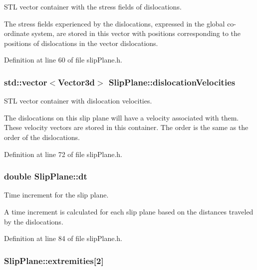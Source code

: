 S\-T\-L vector container with the stress fields of dislocations. 

The stress fields experienced by the dislocations, expressed in the global co-\/ordinate system, are stored in this vector with positions corresponding to the positions of dislocations in the vector dislocations. 

Definition at line 60 of file slip\-Plane.\-h.

\hypertarget{classSlipPlane_a107a3883169bf918664cb4e4fd4bd72c}{
\subsubsection[{dislocation\-Velocities}]{\setlength{\rightskip}{0pt plus 5cm}std\-::vector$<${\bf Vector3d}$>$ Slip\-Plane\-::dislocation\-Velocities\hspace{0.3cm}{\ttfamily [protected]}}}\label{db/d25/classSlipPlane_a107a3883169bf918664cb4e4fd4bd72c}


S\-T\-L vector container with dislocation velocities. 

The dislocations on this slip plane will have a velocity associated with them. These velocity vectors are stored in this container. The order is the same as the order of the dislocations. 

Definition at line 72 of file slip\-Plane.\-h.

\hypertarget{classSlipPlane_ad786135547799363ad2931e43522c2be}{
\subsubsection[{dt}]{\setlength{\rightskip}{0pt plus 5cm}double Slip\-Plane\-::dt\hspace{0.3cm}{\ttfamily [protected]}}}\label{db/d25/classSlipPlane_ad786135547799363ad2931e43522c2be}


Time increment for the slip plane. 

A time increment is calculated for each slip plane based on the distances traveled by the dislocations. 

Definition at line 84 of file slip\-Plane.\-h.

\hypertarget{classSlipPlane_abbdbe6ed805faf3777b54ff55a9c089c}{
\subsubsection[{extremities}]{ Slip\-Plane\-::extremities\mbox{[}2\mbox{]}\hspace{0.3cm}{\ttfamily [protected]}}}\label{db/d25/classSlipPlane_abbdbe6ed805faf3777b54ff55a9c089c}


